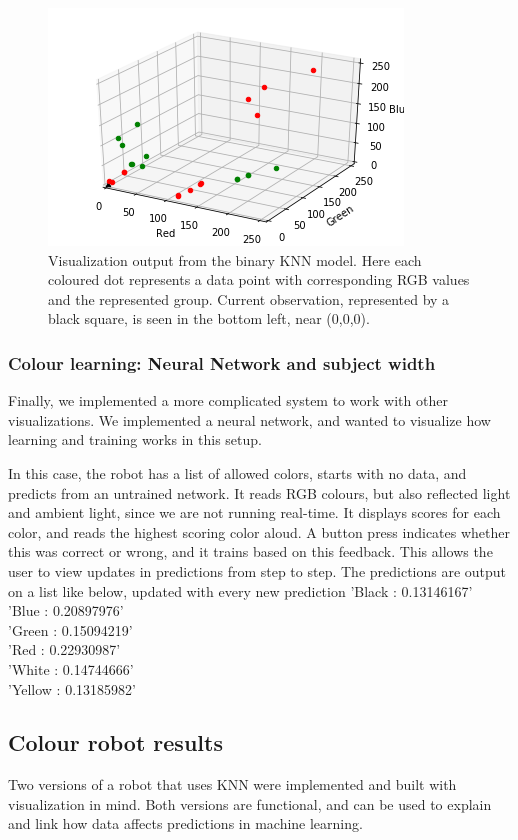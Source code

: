 \documentclass[11pt, a4paper]{article}
\begin{document}
	\begin{figure}[H]
		\centering
		\includegraphics[width=0.6\linewidth]{images/ColourKNNversion2.png}	
		\caption{Visualization output from the binary KNN model. Here each coloured dot represents a data point with corresponding RGB values and the represented group. Current observation, represented by a black square, is seen in the bottom left, near (0,0,0).}
		\label{fig:colour_KNN_binary}
	\end{figure}
	\subsubsection{Colour learning: Neural Network and subject width}
	Finally, we implemented a more complicated system to work with other visualizations. We implemented a neural network, and wanted to visualize how learning and training works in this setup. 
	
	In this case, the robot has a list of allowed colors, starts with no data, and predicts from an untrained network. It reads RGB colours, but also reflected light and ambient light, since we are not running real-time. It displays scores for each color, and reads the highest scoring color aloud. A button press indicates whether this was correct or wrong, and it trains based on this feedback. This allows the user to view updates in predictions from step to step. The predictions are output on a list like below, updated with every new prediction
	\bigskip
	'Black : 0.13146167' \\
	\bigskip
	'Blue : 0.20897976' \\
	\bigskip
	'Green : 0.15094219' \\
	\bigskip
	'Red : 0.22930987' \\
	\bigskip
	'White : 0.14744666' \\
	\bigskip
	'Yellow : 0.13185982' 
	
	\subsection{Colour robot results}
	Two versions of a robot that uses KNN were implemented and built with visualization in mind. Both versions are functional, and can be used to explain and link how data affects predictions in machine learning.
	
\end{document}
